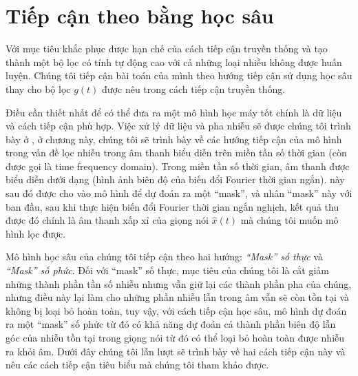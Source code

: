 \section{Tiếp cận theo bằng học sâu}

	Với mục tiêu khắc phục được hạn chế của cách tiếp cận truyền thống và tạo thành một bộ lọc có tính tự động cao với cả những loại nhiễu không được huấn luyện. Chúng tôi tiếp cận bài toán của mình theo hướng tiếp cận sử dụng học sâu thay cho bộ lọc $g(t)$ được nêu trong cách tiếp cận truyền thống.
	
	Điều cần thiết nhất để có thể đưa ra một mô hình học máy tốt chính là dữ liệu và cách tiếp cận phù hợp. Việc xử lý dữ liệu và pha nhiễu sẽ được chúng tôi trình bày ở , ở chương này, chúng tôi sẽ trình bày về các hướng tiếp cận của mô hình trong vấn đề lọc nhiễu trong âm thanh biểu diễn trên miền tần số thời gian (còn được gọi là time frequency domain). Trong miền tần số thời gian, âm thanh được biểu diễn dưới dạng \spectrogram{} (hình ảnh biên độ của biến đổi Fourier thời gian ngắn). \Spectrogram{} này sau đó được cho vào mô hình để dự đoán ra một ``mask'', và nhân ``mask'' này với \spectrogram{} ban đầu, sau khi thực hiện biến đổi Fourier thời gian ngắn nghịch, kết quả thu được đó chính là âm thanh xấp xỉ của giọng nói $\hat{x}(t)$ mà chúng tôi muốn mô hình lọc được.
	
	Mô hình học sâu của chúng tôi tiếp cận theo hai hướng: \textit{``Mask'' số thực} và \textit{``Mask'' số phức}. Đối với ``mask'' số thực, mục tiêu của chúng tôi là cắt giảm những thành phần tần số nhiễu nhưng vẫn giữ lại các thành phần pha của chúng, nhưng điều này lại làm cho những phần nhiễu lẫn trong âm vẫn sẽ còn tồn tại và không bị loại bỏ hoàn toàn, tuy vậy, với cách tiếp cận học sâu, mô hình dự đoán ra một ``mask'' số phức từ đó có khả năng dự đoán cả thành phần biên độ lẫn góc của nhiễu tồn tại trong giọng nói từ đó có thể loại bỏ hoàn toàn được nhiễu ra khỏi âm. Dưới đây chúng tôi lẫn lượt sẽ trình bày về hai cách tiếp cận này và nêu các cách tiếp cận tiêu biểu mà chúng tôi tham khảo được.
	
